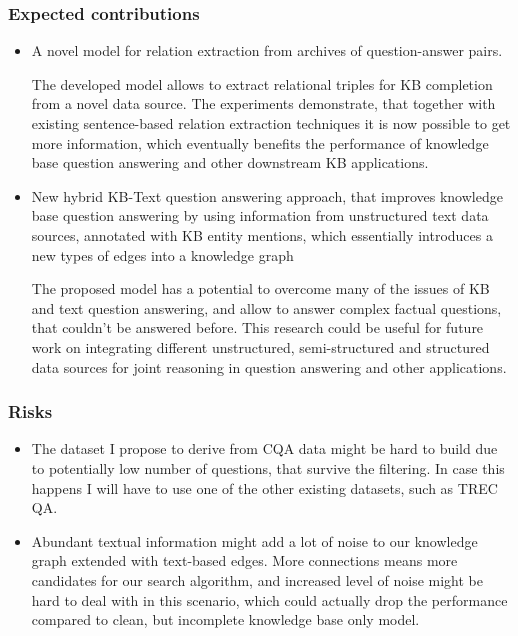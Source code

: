 \subsubsection{Expected contributions}
\label{section:proposal:plan:factoid:contributions}

\begin{itemize}
\item A novel model for relation extraction from archives of question-answer pairs.

The developed model allows to extract relational triples for KB completion from a novel data source.
The experiments demonstrate, that together with existing sentence-based relation extraction techniques it is now possible to get more information, which eventually benefits the performance of knowledge base question answering and other downstream KB applications.

\item New hybrid KB-Text question answering approach, that improves knowledge base question answering by using information from unstructured text data sources, annotated with KB entity mentions, which essentially introduces a new types of edges into a knowledge graph

The proposed model has a potential to overcome many of the issues of KB and text question answering, and allow to answer complex factual questions, that couldn't be answered before.
This research could be useful for future work on integrating different unstructured, semi-structured and structured data sources for joint reasoning in question answering and other applications.

\end{itemize}

\subsubsection{Risks}
\label{section:proposal:plan:factoid:risks}

\begin{itemize}
\item The dataset I propose to derive from CQA data might be hard to build due to potentially low number of questions, that survive the filtering. In case this happens I will have to use one of the other existing datasets, such as TREC QA.
\item Abundant textual information might add a lot of noise to our knowledge graph extended with text-based edges. More connections means more candidates for our search algorithm, and increased level of noise might be hard to deal with in this scenario, which could actually drop the performance compared to clean, but incomplete knowledge base only model.
\end{itemize}


